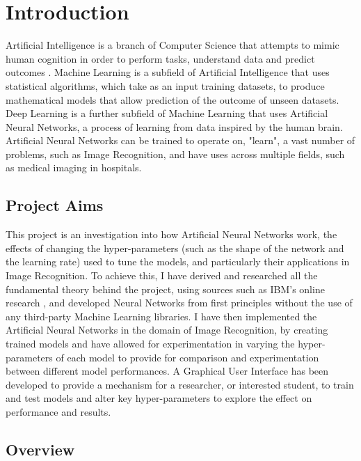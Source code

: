\documentclass[./project-report/src/latex/project-report.tex]{subfiles}
\begin{document}
\maketitle

\clearpage
\section{Introduction}

Artificial Intelligence is a branch of Computer Science that attempts to mimic human cognition in order to perform tasks, understand data and predict outcomes 
\cite{hunt2014artificial}. Machine Learning is a subfield of Artificial Intelligence that uses statistical algorithms, which take as an input training datasets, to produce 
mathematical models that allow prediction of the outcome of unseen datasets. Deep Learning is a further subfield of Machine Learning that uses Artificial Neural Networks, a 
process of learning from data inspired by the human brain. Artificial Neural Networks can be trained to operate on, "learn", a vast number of problems, such as Image 
Recognition, and have uses across multiple fields, such as medical imaging in hospitals.

\subsection{Project Aims}

This project is an investigation into how Artificial Neural Networks work, the effects of changing the hyper-parameters (such as the shape of the network and the 
learning rate) used to tune the models, and particularly their applications in Image Recognition. To achieve this, I have derived and researched all the fundamental 
theory behind the project, using sources such as IBM's online research \cite{IBMweb}, and developed Neural Networks from first principles without the use of any third-party 
Machine Learning libraries. I have then implemented the Artificial Neural Networks in the domain of Image Recognition, by creating trained models and have allowed for 
experimentation in varying the hyper-parameters of each model to provide for comparison and experimentation between different model performances. A Graphical User Interface 
has been developed to provide a mechanism for a researcher, or interested student, to train and test models and alter key hyper-parameters to explore the effect on 
performance and results.

\subsection{Overview}
\end{document}
